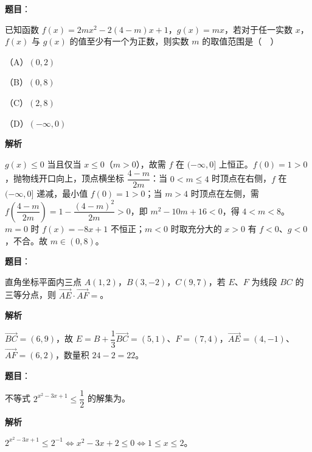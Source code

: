 \begin{answer}

\textbf{题目}：

已知函数 $f(x)=2mx^2-2(4-m)x+1$，$g(x)=mx$，若对于任一实数 $x$，$f(x)$ 与 $g(x)$ 的值至少有一个为正数，则实数 $m$ 的取值范围是（　）

（A）$(0,2)$

（B）$(0,8)$

（C）$(2,8)$

（D）$(-\infty,0)$

\textbf{解析}

$g(x)\leqslant0$ 当且仅当 $x\leqslant0$（$m>0$），故需 $f$ 在 $(-\infty,0]$ 上恒正。$f(0)=1>0$，抛物线开口向上，顶点横坐标 $\dfrac{4-m}{2m}$：当 $0<m\leqslant4$ 时顶点在右侧，$f$ 在 $(-\infty,0]$ 递减，最小值 $f(0)=1>0$；当 $m>4$ 时顶点在左侧，需 $f\left(\dfrac{4-m}{2m}\right)=1-\dfrac{(4-m)^2}{2m}>0$，即 $m^2-10m+16<0$，得 $4<m<8$。$m=0$ 时 $f(x)=-8x+1$ 不恒正；$m<0$ 时取充分大的 $x>0$ 有 $f<0$、$g<0$，不合。故 $m\in(0,8)$。


\end{answer}
\begin{answer}

\textbf{题目}：

直角坐标平面内三点 $A(1,2)$，$B(3,-2)$，$C(9,7)$，若 $E$、$F$ 为线段 $BC$ 的三等分点，则 $\overrightarrow{AE}\cdot\overrightarrow{AF}=$\gkblank{}。

\textbf{解析}

$\overrightarrow{BC}=(6,9)$，故 $E=B+\dfrac13\overrightarrow{BC}=(5,1)$、$F=(7,4)$，$\overrightarrow{AE}=(4,-1)$、$\overrightarrow{AF}=(6,2)$，数量积 $24-2=22$。


\end{answer}
\begin{answer}

\textbf{题目}：

不等式 $2^{x^2-3x+1}\leqslant\dfrac12$ 的解集为\gkblank{}。

\textbf{解析}

$2^{x^2-3x+1}\leqslant2^{-1}\iff x^2-3x+2\leqslant0\iff1\leqslant x\leqslant2$。


\end{answer}
